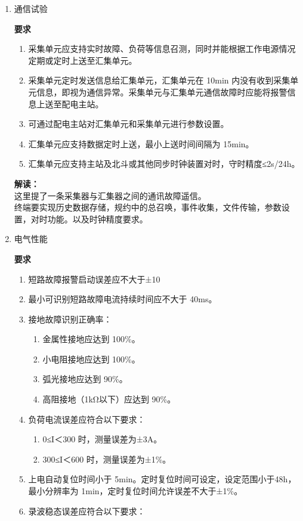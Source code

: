 \documentclass{article}
\begin{document}
\begin{CJK}{UTF8}{gbsn}
\begin{enumerate}
	\item 通信试验 
		\par
		\textbf{要求}
		\begin{enumerate}
		\item 采集单元应支持实时故障、负荷等信息召测，同时并能根据工作电源情况定期或定时上送至汇集单元。 
		\item 采集单元定时发送信息给汇集单元，汇集单元在 10min 内没有收到采集单元信息，即视为通信异常。采集单元与汇集单元通信故障时应能将报警信息上送至配电主站。 
		\item 可通过配电主站对汇集单元和采集单元进行参数设置。 
		\item 汇集单元应支持数据定时上送，最小上送时间间隔为 15min。 
		\item 汇集单元应支持主站及北斗或其他同步时钟装置对时，守时精度≤2s/24h。		
		\end{enumerate}
		\textbf{解读：}\\
		这里提了一条采集器与汇集器之间的通讯故障遥信。\\
		终端要实现历史数据存储，规约中的总召唤，事件收集，文件传输，参数设置，对时功能。以及时钟精度要求。
	\item 电气性能		
		\par
		\textbf{要求}
			\begin{enumerate}
				\item 短路故障报警启动误差应不大于±10%
				\item 最小可识别短路故障电流持续时间应不大于 40ms。 
				\item 接地故障识别正确率： 
					\begin{enumerate}
						\item 金属性接地应达到 100\%。 
				    	\item 小电阻接地应达到 100\%。 
				    	\item 弧光接地应达到 90\%。 
				    	\item 高阻接地（1kΩ以下）应达到 90\%。 
					\end{enumerate}
				\item 负荷电流误差应符合以下要求：
					\begin{enumerate}
						\item  0≤I＜300 时，测量误差为±3A。 
				    	\item 300≤I＜600 时，测量误差为±1\%。 
					\end{enumerate}
				\item 上电自动复位时间小于 5min。定时复位时间可设定，设定范围小于48h，最小分辨率为 1min，定时复位时间允许误差不大于±1\%。 
				\item 录波稳态误差应符合以下要求： 

\end{enumerate}
\end{enumerate}
\end{CJK}
\end{document}
